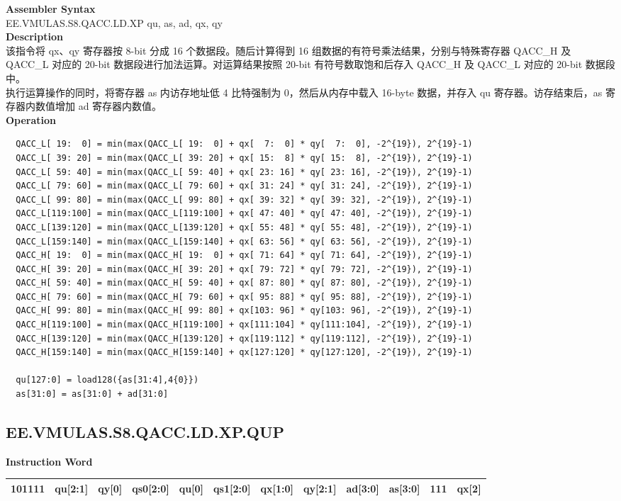 \textbf{Assembler Syntax} \\
EE.VMULAS.S8.QACC.LD.XP qu, as, ad, qx, qy \\
\textbf{Description} \\
该指令将 qx、qy 寄存器按 8-bit 分成 16 个数据段。随后计算得到 16 组数据的有符号乘法结果，分别与特殊寄存器 QACC\_H 及 QACC\_L 对应的 20-bit 数据段进行加法运算。对运算结果按照 20-bit 有符号数取饱和后存入 QACC\_H 及 QACC\_L 对应的 20-bit 数据段中。\\
执行运算操作的同时，将寄存器 as 内访存地址低 4 比特强制为 0，然后从内存中载入 16-byte 数据，并存入 qu 寄存器。访存结束后，as 寄存器内数值增加 ad 寄存器内数值。\\
\textbf{Operation}
\begin{lstlisting}
  QACC_L[ 19:  0] = min(max(QACC_L[ 19:  0] + qx[  7:  0] * qy[  7:  0], -2^{19}), 2^{19}-1)
  QACC_L[ 39: 20] = min(max(QACC_L[ 39: 20] + qx[ 15:  8] * qy[ 15:  8], -2^{19}), 2^{19}-1)
  QACC_L[ 59: 40] = min(max(QACC_L[ 59: 40] + qx[ 23: 16] * qy[ 23: 16], -2^{19}), 2^{19}-1)
  QACC_L[ 79: 60] = min(max(QACC_L[ 79: 60] + qx[ 31: 24] * qy[ 31: 24], -2^{19}), 2^{19}-1)
  QACC_L[ 99: 80] = min(max(QACC_L[ 99: 80] + qx[ 39: 32] * qy[ 39: 32], -2^{19}), 2^{19}-1)
  QACC_L[119:100] = min(max(QACC_L[119:100] + qx[ 47: 40] * qy[ 47: 40], -2^{19}), 2^{19}-1)
  QACC_L[139:120] = min(max(QACC_L[139:120] + qx[ 55: 48] * qy[ 55: 48], -2^{19}), 2^{19}-1)
  QACC_L[159:140] = min(max(QACC_L[159:140] + qx[ 63: 56] * qy[ 63: 56], -2^{19}), 2^{19}-1)
  QACC_H[ 19:  0] = min(max(QACC_H[ 19:  0] + qx[ 71: 64] * qy[ 71: 64], -2^{19}), 2^{19}-1)
  QACC_H[ 39: 20] = min(max(QACC_H[ 39: 20] + qx[ 79: 72] * qy[ 79: 72], -2^{19}), 2^{19}-1)
  QACC_H[ 59: 40] = min(max(QACC_H[ 59: 40] + qx[ 87: 80] * qy[ 87: 80], -2^{19}), 2^{19}-1)
  QACC_H[ 79: 60] = min(max(QACC_H[ 79: 60] + qx[ 95: 88] * qy[ 95: 88], -2^{19}), 2^{19}-1)
  QACC_H[ 99: 80] = min(max(QACC_H[ 99: 80] + qx[103: 96] * qy[103: 96], -2^{19}), 2^{19}-1)
  QACC_H[119:100] = min(max(QACC_H[119:100] + qx[111:104] * qy[111:104], -2^{19}), 2^{19}-1)
  QACC_H[139:120] = min(max(QACC_H[139:120] + qx[119:112] * qy[119:112], -2^{19}), 2^{19}-1)
  QACC_H[159:140] = min(max(QACC_H[159:140] + qx[127:120] * qy[127:120], -2^{19}), 2^{19}-1)

  qu[127:0] = load128({as[31:4],4{0}})
  as[31:0] = as[31:0] + ad[31:0]
\end{lstlisting}

\clearpage
\subsection{EE.VMULAS.S8.QACC.LD.XP.QUP}\label{instruction:EEVMULASS8QACCLDXPQUP}
\setlength\tabcolsep{6pt}
\textbf{Instruction Word} \\
\begin{tabular}{|c|c|c|c|c|c|c|c|c|c|c|c|}
	\hline
	101111 & qu[2:1] & qy[0] & qs0[2:0] & qu[0] & qs1[2:0] & qx[1:0] & qy[2:1] & ad[3:0] & as[3:0] & 111 & qx[2] \\
	\hline
\end{tabular}

